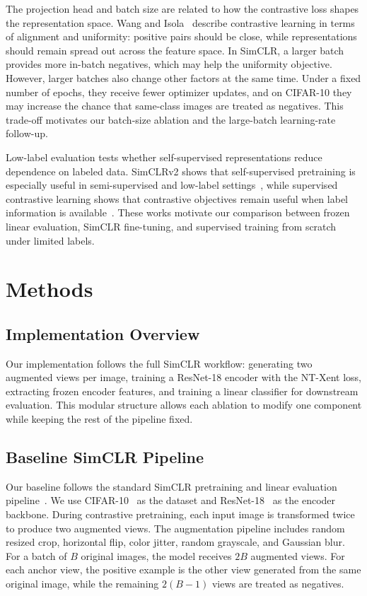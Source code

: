 \documentclass[10pt]{article}
\begin{document}
The projection head and batch size are related to how the contrastive loss shapes the representation space. Wang and Isola~\cite{alignuniform} describe contrastive learning in terms of alignment and uniformity: positive pairs should be close, while representations should remain spread out across the feature space. In SimCLR, a larger batch provides more in-batch negatives, which may help the uniformity objective. However, larger batches also change other factors at the same time. Under a fixed number of epochs, they receive fewer optimizer updates, and on CIFAR-10 they may increase the chance that same-class images are treated as negatives. This trade-off motivates our batch-size ablation and the large-batch learning-rate follow-up.

Low-label evaluation tests whether self-supervised representations reduce dependence on labeled data. SimCLRv2 shows that self-supervised pretraining is especially useful in semi-supervised and low-label settings~\cite{simclrv2}, while supervised contrastive learning shows that contrastive objectives remain useful when label information is available~\cite{supcon}. These works motivate our comparison between frozen linear evaluation, SimCLR fine-tuning, and supervised training from scratch under limited labels.

\section{Methods}

\subsection{Implementation Overview}

Our implementation follows the full SimCLR workflow: generating two augmented views per image, training a ResNet-18 encoder with the NT-Xent loss, extracting frozen encoder features, and training a linear classifier for downstream evaluation. This modular structure allows each ablation to modify one component while keeping the rest of the pipeline fixed.

\subsection{Baseline SimCLR Pipeline}

Our baseline follows the standard SimCLR pretraining and linear evaluation pipeline~\cite{simclr}. We use CIFAR-10~\cite{cifar10} as the dataset and ResNet-18~\cite{resnet} as the encoder backbone. During contrastive pretraining, each input image is transformed twice to produce two augmented views. The augmentation pipeline includes random resized crop, horizontal flip, color jitter, random grayscale, and Gaussian blur. For a batch of $B$ original images, the model receives $2B$ augmented views. For each anchor view, the positive example is the other view generated from the same original image, while the remaining $2(B-1)$ views are treated as negatives.
\end{document}
